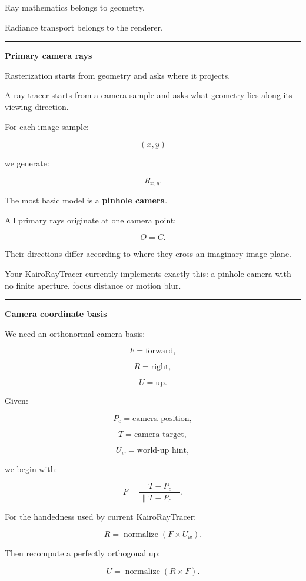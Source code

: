 Ray mathematics belongs to geometry.

Radiance transport belongs to the renderer.

\begin{center}\rule{0.5\linewidth}{0.5pt}\end{center}

\textbf{Primary camera rays}

Rasterization starts from geometry and asks where it projects.

A ray tracer starts from a camera sample and asks what geometry lies along its viewing direction.

For each image sample:

\[
(x,y)
\]

we generate:

\[
R_{x,y}.
\]

The most basic model is a \textbf{pinhole camera}.

All primary rays originate at one camera point:

\[
O=C.
\]

Their directions differ according to where they cross an imaginary image plane.

Your KairoRayTracer currently implements exactly this: a pinhole camera with no finite aperture, focus distance or motion blur.

\begin{center}\rule{0.5\linewidth}{0.5pt}\end{center}

\textbf{Camera coordinate basis}

We need an orthonormal camera basis:

\[
F=\text{forward},
\]

\[
R=\text{right},
\]

\[
U=\text{up}.
\]

Given:

\[
P_c=\text{camera position},
\]

\[
T=\text{camera target},
\]

\[
U_w=\text{world-up hint},
\]

we begin with:

\[
F=
\frac{T-P_c}
{\|T-P_c\|}.
\]

For the handedness used by current KairoRayTracer:

\[
R=
\operatorname{normalize}
(
F\times U_w
).
\]

Then recompute a perfectly orthogonal up:

\[
U=
\operatorname{normalize}
(
R\times F
).
\]

